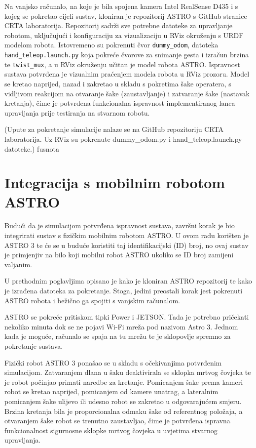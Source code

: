 \documentclass[12pt,a4paper,oneside]{report}
\begin{document}
Na vanjsko računalo, na koje je bila spojena kamera Intel RealSense D435 i s kojeg se pokretao cijeli 
sustav, kloniran je repozitorij ASTRO s GitHub stranice CRTA laboratorija. Repozitorij sadrži sve potrebne 
datoteke za upravljanje robotom, uključujući i konfiguraciju za vizualizaciju u RViz okruženju s URDF 
modelom robota. Istovremeno su pokrenuti čvor \texttt{dummy\_odom}, datoteka \texttt{hand\_teleop.launch.py} 
koja pokreće čvorove za snimanje gesta i izračun brzina te \texttt{twist\_mux}, a u RViz okruženju učitan 
je model robota ASTRO. Ispravnost sustava potvrđena je vizualnim praćenjem modela robota u RViz prozoru. 
Model se kretao naprijed, nazad i zakretao u skladu s pokretima šake operatera, s vidljivom reakcijom na 
otvaranje šake (zaustavljanje) i zatvaranje šake (nastavak kretanja), čime je potvrđena funkcionalna 
ispravnost implementiranog lanca upravljanja prije testiranja na stvarnom robotu.

(Upute za pokretanje simulacije nalaze se na GitHub repozitoriju CRTA laboratorija. Uz RViz su pokrenute 
dummy\_odom.py i hand\_teleop.launch.py datoteke.) fusnota


\section{Integracija s mobilnim robotom ASTRO}
Budući da je simulacijom potvrđena ispravnost sustava, završni korak je bio integrirati sustav s fizičkim 
mobilnim robotom ASTRO. 
U ovom radu korišten je ASTRO 3 te će se u buduće koristiti taj identifikacijski (ID) broj, no ovaj sustav je 
primjenjiv na bilo koji mobilni robot ASTRO ukoliko se ID broj zamijeni valjanim.

U prethodnim poglavljima opisano je kako je kloniran ASTRO repozitorij te kako je izrađena datoteka za pokretanje. 
Stoga, jedini preostali korak jest pokrenuti ASTRO robota i bežično ga spojiti s vanjskim računalom. 

ASTRO se pokreće pritiskom tipki Power i JETSON. Tada je potrebno pričekati nekoliko 
minuta dok se ne pojavi Wi-Fi mreža pod nazivom Astro 3. Jednom kada je moguće, računalo se spaja na tu mrežu 
te je sklopovlje spremno za pokretanje sustava. 

Fizički robot ASTRO 3 ponašao se u skladu s očekivanjima potvrđenim simulacijom. Zatvaranjem dlana u šaku 
deaktivirala se sklopka mrtvog čovjeka te je robot počinjao primati naredbe za kretanje. Pomicanjem šake 
prema kameri robot se kretao naprijed, pomicanjem od kamere unatrag, a lateralnim pomicanjem šake ulijevo 
ili udesno robot se zakretao u odgovarajućem smjeru. Brzina kretanja bila je proporcionalna odmaku šake od 
referentnog položaja, a otvaranjem šake robot se trenutno zaustavljao, čime je potvrđena ispravna 
funkcionalnost sigurnosne sklopke mrtvog čovjeka u uvjetima stvarnog upravljanja. 
\end{document}
